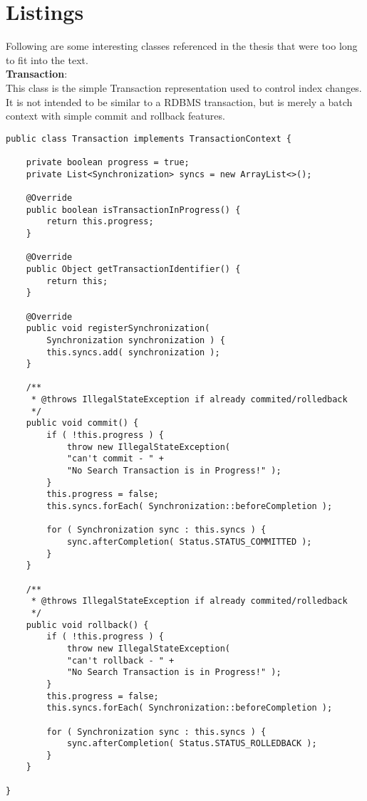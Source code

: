 \pagebreak

\section*{Listings}

Following are some interesting classes referenced in the thesis that were too long to fit into the text.
\\

\noindent
\textbf{Transaction}:\\
This class is the simple Transaction representation used to control index changes. It is not intended to be similar to a RDBMS transaction, but is merely a batch context with simple commit and rollback features.
\\
\lstset{language=java}
\begin{lstlisting}[frame=htrbl, caption={the simple Transaction contract}, label={lst:Transaction.java}]
public class Transaction implements TransactionContext {

	private boolean progress = true;
	private List<Synchronization> syncs = new ArrayList<>();
	
	@Override
	public boolean isTransactionInProgress() {
		return this.progress;
	}
	
	@Override
	public Object getTransactionIdentifier() {
		return this;
	}
	
	@Override
	public void registerSynchronization(
		Synchronization synchronization ) {
		this.syncs.add( synchronization );
	}
	
	/**
	 * @throws IllegalStateException if already commited/rolledback
	 */
	public void commit() {
		if ( !this.progress ) {
			throw new IllegalStateException( 
			"can't commit - " + 
			"No Search Transaction is in Progress!" );
		}
		this.progress = false;
		this.syncs.forEach( Synchronization::beforeCompletion );
		
		for ( Synchronization sync : this.syncs ) {
			sync.afterCompletion( Status.STATUS_COMMITTED );
		}
	}
	
	/**
	 * @throws IllegalStateException if already commited/rolledback
 	 */
	public void rollback() {
		if ( !this.progress ) {
			throw new IllegalStateException( 
			"can't rollback - " + 
			"No Search Transaction is in Progress!" );
		}
		this.progress = false;
		this.syncs.forEach( Synchronization::beforeCompletion );
	
		for ( Synchronization sync : this.syncs ) {
			sync.afterCompletion( Status.STATUS_ROLLEDBACK );
		}
	}

}
\end{lstlisting}

